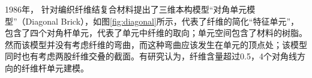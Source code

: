1986年， \citeauthor{ma_elastic_1986} \cite{ma_elastic_1986} 针对编织纤维结复合材料提出了三维本构模型“对角单元模型”（Diagonal Brick），如图\ref{fig:diagonal}所示，代表了纤维的简化“特征单元”，包含了四个对角杆单元，代表了单元中纤维的取向；单元空间包含了材料的树脂。然而该模型并没有考虑纤维的弯曲，而这种弯曲应该发生在单元的顶点处；该模型同时也有考虑两股纤维交叠的截面\cite{whitney_modeling_1989}。有研究认为\cite{du1993unit}，纤维含量超过0.5，4个对角线方向的纤维杆单元建模。


\begin{figure}
	\centering
	\hspace{1cm}
	\label{fig:Models-of Braided-Composites}
\end{figure}





